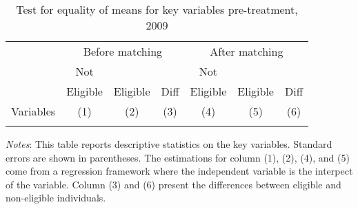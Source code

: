 \begin{table}[H]
	\centering 
	\begin{adjustbox}{width=\linewidth}
		\begin{threeparttable}
			\caption{Test for equality of means for key variables pre-treatment, 2009}
			\label{tab:balance}
			\begin{tabular}{@{}l*{6}{c}@{}}
				\toprule
								&
				\multicolumn{3}{c}{Before matching}	&
				\multicolumn{3}{c}{After matching}	\\
				\cmidrule(lr){2-4}	
				\cmidrule(l){5-7}
								&
				Not 			&
								&
								&
				Not				&
								&
								\\
								&
				Eligible		&	
				Eligible		& 
				Diff 			&
				Eligible		&
				Eligible		& 
				Diff 			\\
				Variables 		& 
				(1)				&
				(2)				&
				(3)				&
				(4)				&
				(5)				&
				(6)				\\
				\midrule 
				 \\ [-3ex]
				\bottomrule
			\end{tabular}
			\begin{tablenotes}
				\setlength{}
				\footnotesize
				\item \textit{Notes}: This table reports descriptive statistics on the key variables. Standard errors are shown in parentheses. The estimations for column (1), (2), (4), and (5) come from a regression framework where the independent variable is the interpect of the variable. Column (3) and (6) present the differences between eligible and non-eligible individuals. 
			\end{tablenotes}
		\end{threeparttable}
	\end{adjustbox}
\end{table}
\newpage 

